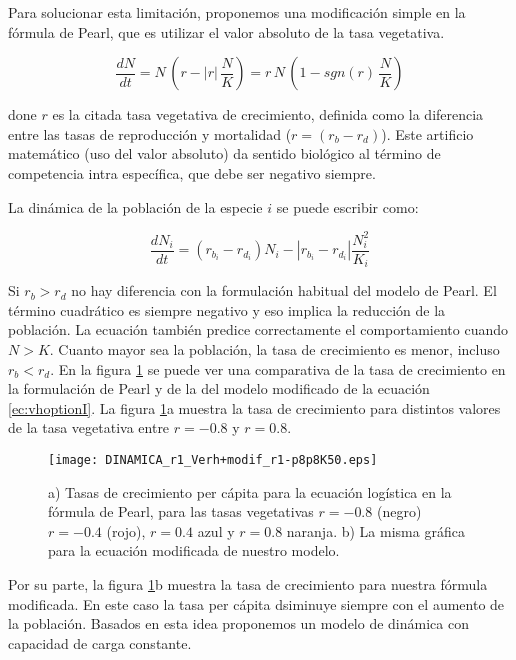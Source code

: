 Para solucionar esta limitación, proponemos una modificación simple en la fórmula de Pearl, que es utilizar el valor absoluto de la tasa vegetativa.

\begin{equation}
\frac{dN}{dt}= N \, \left(r - |r|\,    \frac{N}{K}\right)= r\,N \,\left(1-sgn(r)\,\frac{N}{K}\right)
\label{eq:Verh_r}
\end{equation}

\noindent done $r$ es la citada tasa vegetativa de crecimiento, definida como la diferencia entre las tasas de reproducción y mortalidad ($r=\left(r_{b}-r_{d}\right)$). Este artificio matemático (uso del valor absoluto) da sentido biológico al término de competencia intra específica, que debe ser negativo siempre.

La dinámica de la población de la especie $i$ se puede escribir como:

\begin{equation}
\displaystyle \frac{dN_i}{dt}=\left(r_{b_i}-r_{d_i}\right) N_i - |r_{b_i}-r_{d_i}| \frac{N^2_i}{K_i}
\label{ec:vhoptionI}
\end{equation}

Si $r_b > r_d$ no hay diferencia con la formulación habitual del modelo de Pearl. El término cuadrático es siempre negativo y eso implica la reducción de la población. La ecuación también predice correctamente el comportamiento cuando $N>K$. Cuanto mayor sea la población, la tasa de crecimiento es menor, incluso $r_b < r_d$. En la figura \ref{fig:r_equiv_Verh+modif} se puede ver una comparativa de la tasa de crecimiento en la formulación de Pearl y de la del modelo modificado de la ecuación \ref{ec:vhoptionI}. La figura \ref{fig:r_equiv_Verh+modif}a muestra la tasa de crecimiento para distintos valores de la tasa vegetativa entre $r=-0.8$ y $r=0.8$.
 
 
\begin{figure}[ht]
\centering
\texttt{[image: DINAMICA\_r1\_Verh+modif\_r1-p8p8K50.eps]}
\caption{a) Tasas de crecimiento per cápita para la ecuación logística en la fórmula de Pearl, para las tasas vegetativas $r=-0.8$ (negro)
$r=-0.4$ (rojo), $r=0.4$ azul y $r=0.8$ naranja. b) La misma gráfica para la ecuación modificada de nuestro modelo.}
\label{fig:r_equiv_Verh+modif}
\end{figure}

Por su parte, la figura \ref{fig:r_equiv_Verh+modif}b muestra la tasa de crecimiento para nuestra fórmula modificada. En este caso la tasa per cápita dsiminuye siempre con el aumento de la población. Basados en esta idea proponemos un modelo de dinámica con capacidad de carga constante.


